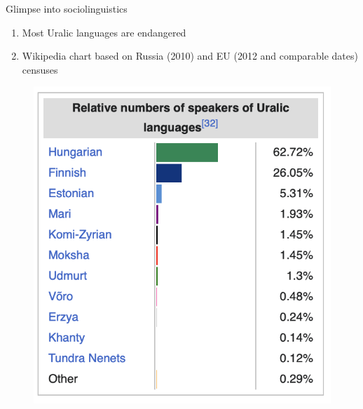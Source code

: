 \documentclass[10 pt, handout]{beamer}
\begin{document}
\begin{frame}{Glimpse into sociolinguistics}

	\begin{enumerate}[$\gg$]
		\item Most Uralic languages are endangered
		\item Wikipedia chart based on Russia (2010) and EU (2012 and comparable dates) censuses
	\end{enumerate}
	
	\begin{figure}[H]
		\centering
		\includegraphics[scale=.5]{wiki-chart}
	\end{figure}

\end{frame}
\end{document}
